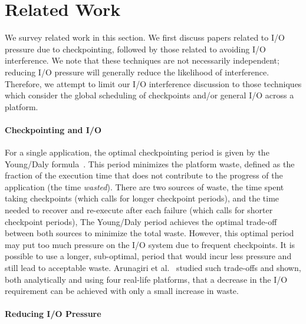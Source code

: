 

\section{Related Work}\label{sec:related}

We survey related work in this section. We first discuss papers related to I/O
pressure due to checkpointing, followed by those related to avoiding I/O
interference.  We note that these techniques are not necessarily independent;
reducing I/O pressure will generally reduce the likelihood of interference.
Therefore, we attempt to limit our I/O interference discussion to those
techniques which consider the global scheduling of checkpoints and/or general
I/O across a platform.


\paragraph{Checkpointing and I/O}

For a single application, the optimal checkpointing period is given by the
Young/Daly formula~\cite{young74,daly04}. This period minimizes the platform
waste, defined as the fraction of the execution time that does not contribute
to the progress of the application (the time \emph{wasted}).  There are two
sources of waste, the time spent taking checkpoints (which calls for longer
checkpoint periods), and the time needed to recover and re-execute after each
failure (which calls for shorter checkpoint periods), The Young/Daly period
achieves the optimal trade-off between both sources to minimize the total
waste.  However, this optimal period may put too much pressure on the I/O
system due to frequent checkpoints. It is possible to use a longer,
sub-optimal, period that would incur less pressure and still lead to acceptable
waste. Arunagiri et al.~\cite{Arunagiri2010} studied such trade-offs and shown,
both analytically and using four real-life platforms, that a decrease in the
I/O requirement can be achieved with only a small increase in waste.

\paragraph{Reducing I/O Pressure}

